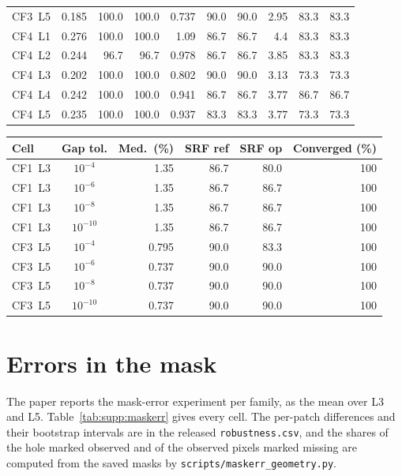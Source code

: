 \documentclass[11pt]{article}
\begin{document}
\begin{table}[htbp]
\begin{tabular}{@{}l*{9}{r}@{}}
CF3~L5 & 0.185 & 100.0 & 100.0 & 0.737 & 90.0 & 90.0 & 2.95 & 83.3 & 83.3 \\
CF4~L1 & 0.276 & 100.0 & 100.0 & 1.09 & 86.7 & 86.7 & 4.4 & 83.3 & 83.3 \\
CF4~L2 & 0.244 & 96.7 & 96.7 & 0.978 & 86.7 & 86.7 & 3.85 & 83.3 & 83.3 \\
CF4~L3 & 0.202 & 100.0 & 100.0 & 0.802 & 90.0 & 90.0 & 3.13 & 73.3 & 73.3 \\
CF4~L4 & 0.242 & 100.0 & 100.0 & 0.941 & 86.7 & 86.7 & 3.77 & 86.7 & 86.7 \\
CF4~L5 & 0.235 & 100.0 & 100.0 & 0.937 & 83.3 & 83.3 & 3.77 & 73.3 & 73.3 \\
\bottomrule
\end{tabular}
\par\medskip
\begin{tabular}{@{}l c r r r r@{}}
\toprule
Cell & Gap tol. & Med.\ (\%) & SRF ref & SRF op & Converged (\%) \\
\midrule
CF1~L3 & $10^{-4}$ & 1.35 & 86.7 & 80.0 & 100 \\
CF1~L3 & $10^{-6}$ & 1.35 & 86.7 & 86.7 & 100 \\
CF1~L3 & $10^{-8}$ & 1.35 & 86.7 & 86.7 & 100 \\
CF1~L3 & $10^{-10}$ & 1.35 & 86.7 & 86.7 & 100 \\
CF3~L5 & $10^{-4}$ & 0.795 & 90.0 & 83.3 & 100 \\
CF3~L5 & $10^{-6}$ & 0.737 & 90.0 & 90.0 & 100 \\
CF3~L5 & $10^{-8}$ & 0.737 & 90.0 & 90.0 & 100 \\
CF3~L5 & $10^{-10}$ & 0.737 & 90.0 & 90.0 & 100 \\
\bottomrule
\end{tabular}
\end{table}

\section{Errors in the mask}
\label{sec:supp:maskerr}

The paper reports the mask-error experiment per family, as the mean over L3 and
L5. Table~\ref{tab:supp:maskerr} gives every cell. The per-patch differences
and their bootstrap intervals are in the released \texttt{robustness.csv}, and
the shares of the hole marked observed and of the observed pixels marked missing
are computed from the saved masks by \texttt{scripts/maskerr\_geometry.py}.
\end{document}
